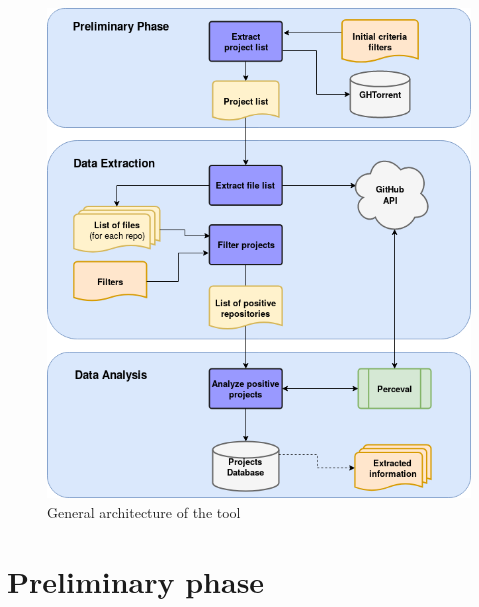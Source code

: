 \documentclass[a4paper, 12pt]{book}
\begin{document}
\begin{figure}
  \centering
  \includegraphics[width=15cm, keepaspectratio]{img/generic-tool-diagram-sections}
  \caption{General architecture of the tool}
  \label{fig:arquitectura}
\end{figure}

\section{Preliminary phase}
\label{sec:preliminary-phase}
\end{document}
